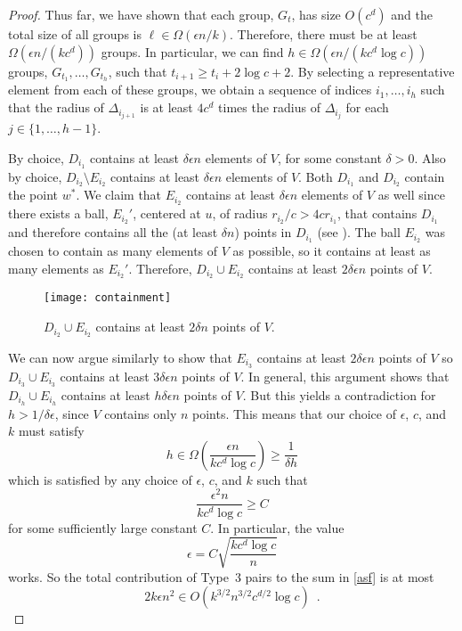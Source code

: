\documentclass{patmorin}
\begin{document}
\begin{proof}
  Thus far, we have shown that each group, $G_t$, has size $O(c^d)$
  and the total size of all groups is $\ell\in\Omega(\epsilon n/k)$.
  Therefore, there must be at least $\Omega(\epsilon n/(kc^d))$ groups.
  In particular, we can find $h\in\Omega(\epsilon n/(kc^d\log c))$ groups,
  $G_{t_1},\ldots,G_{t_h}$, such that $t_{i+1} \ge t_{i}+2\log c+2$.
  By selecting a representative element from each of these groups, we
  obtain a sequence of indices $i_1,\ldots,i_h$ such that the radius of
  $\Delta_{i_{j+1}}$ is at least $4c^d$ times the radius of $\Delta_{i_j}$
  for each $j\in\{1,\ldots,h-1\}$.

  By choice, $D_{i_1}$ contains at least $\delta\epsilon n$ elements of
  $V$, for some constant $\delta >0$.  Also by choice, $D_{i_2}\setminus
  E_{i_2}$ contains at least $\delta\epsilon n$ elements of $V$.
  Both $D_{i_1}$ and $D_{i_2}$ contain the point $w^*$.  We claim
  that $E_{i_2}$ contains at least $\delta\epsilon n$ elements of $V$
  as well since there exists a ball, $E_{i_2}'$, centered at $u$,
  of radius $r_{i_2}/c > 4cr_{i_1}$, that contains $D_{i_1}$ and
  therefore contains all the (at least $\delta n$) points in $D_{i_1}$
  (see ).  The ball $E_{i_2}$ was chosen to contain
  as many elements of $V$ as possible, so it contains at least as many
  elements as $E_{i_2}'$.  Therefore, $D_{i_2}\cup E_{i_2}$ contains at
  least $2\delta \epsilon n$ points of $V$.

  \begin{figure}
     \begin{center}
       \texttt{[image: containment]}
     \end{center}
     \caption{$D_{i_2}\cup E_{i_2}$ contains at least $2\delta n$ 
              points of $V$.}
   \end{figure}

  We can now argue similarly to show that $E_{i_3}$ contains at
  least $2\delta\epsilon n$ points of $V$ so $D_{i_3}\cup E_{i_3}$
  contains at least $3\delta\epsilon n$ points of $V$.  In general,
  this argument shows that $D_{i_h}\cup E_{i_h}$ contains at least
  $h\delta\epsilon n$ points of $V$.  But this yields a contradiction for
  $h> 1/\delta\epsilon$, since $V$ contains only $n$ points.  This means
  that our choice of $\epsilon$, $c$, and $k$ must satisfy
  \[
       h\in\Omega\left(\frac{\epsilon n}{kc^d\log c}\right) \ge
          \frac{1}{\delta h}
  \]
  which is satisfied by any choice of $\epsilon$, $c$, and $k$ such that
  \[
       \frac{\epsilon^2 n}{kc^d\log c} \ge C
  \]
  for some sufficiently large constant $C$.  In particular, the value
  \[
       \epsilon = C\sqrt{\frac{kc^d\log c}{n}}
  \]
  works.
  So the total contribution of Type~3 pairs to the sum in \eqref{asf}
  is at most
  \[
    2k\epsilon n^2 \in O(k^{3/2}n^{3/2}c^{d/2}\log c) \enspace .
  \]


\end{proof}
\end{document}
